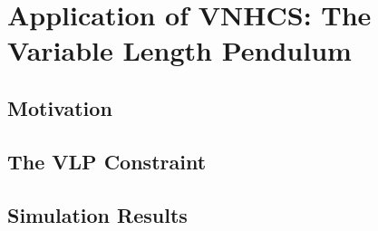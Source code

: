 
\chapter{Application of VNHCS: The Variable Length Pendulum}\label{sec:vlp}
\section{Motivation}
\section{The VLP Constraint}

\section{Simulation Results}

